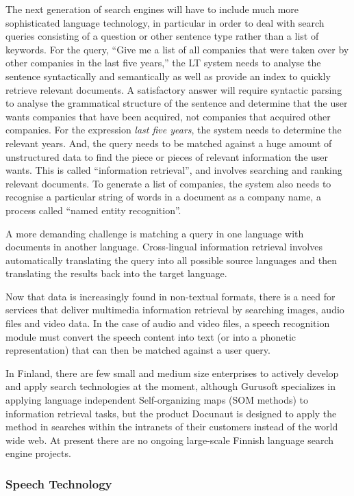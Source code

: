 \documentclass[]{../../metanetpaper}
\begin{document}
\begin{multicols}{2}
The next generation of search engines will have to include much more
sophisticated language technology, in particular in order to deal with
search queries consisting of a question or other sentence type rather
than a list of keywords. For the query, “Give me a list of all
companies that were taken over by other companies in the last five
years,” the LT system needs to analyse the sentence syntactically and
semantically as well as provide an index to quickly retrieve relevant
documents. A satisfactory answer will require syntactic parsing to
analyse the grammatical structure of the sentence and determine that
the user wants companies that have been acquired, not companies that
acquired other companies. For the expression \textit{last five years},
the system needs to determine the relevant years. And, the query needs
to be matched against a huge amount of unstructured data to find the
piece or pieces of relevant information the user wants. This is called
“information retrieval”, and involves searching and ranking relevant
documents. To generate a list of companies, the system also needs to
recognise a particular string of words in a document as a company
name, a process called “named entity recognition”.

A more demanding challenge is matching a query in one language with
documents in another language. Cross-lingual information retrieval
involves automatically translating the query into all possible source
languages and then translating the results back into the target
language.

Now that data is increasingly found in non-textual formats, there is a
need for services that deliver multimedia information retrieval by
searching images, audio files and video data. In the case of audio and
video files, a speech recognition module must convert the speech
content into text (or into a phonetic representation) that can then be
matched against a user query.

In Finland, there are few small and medium size enterprises to actively develop and apply search
technologies at the moment, although Gurusoft specializes in applying
language independent Self-organizing maps (SOM methods) to information
retrieval tasks, but the product Docunaut is designed to apply the method in searches within the intranets of their customers instead of the world wide web. At present
there are no ongoing large-scale Finnish language search engine
projects.

\subsubsection{Speech Technology}


\end{multicols}
\end{document}
